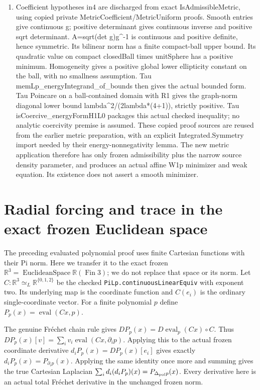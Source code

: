 \documentclass[11pt]{article}
\theoremstyle{definition}
\theoremstyle{remark}
\numberwithin{equation}{section}
\providecommand{\tightlist}{}
\begin{document}
\begin{enumerate}
\def\labelenumi{\arabic{enumi}.}
\setcounter{enumi}{5}
\tightlist
\item
  Coefficient hypotheses in4 are discharged from exact
  IsAdmissibleMetric, using copied private
  MetricCoefficient/MetricUniform proofs. Smooth entries give continuous
  g; positive determinant gives continuous inverse and positive sqrt
  determinant. A=sqrt(det g)g\^{}-1 is continuous and positive definite,
  hence symmetric. Its bilinear norm has a finite compact-ball upper
  bound. Its quadratic value on compact closedBall times unitSphere has
  a positive minimum. Homogeneity gives a positive global lower
  ellipticity constant on the ball, with no smallness assumption. Tau
  memLp\_energyIntegrand\_of\_bounds then gives the actual bounded form.
  Tau Poincare on a ball-contained domain with R1 gives the graph-norm
  diagonal lower bound lambda\^{}2/(2lambda*(4+1)), strictly positive.
  Tau isCoercive\_energyFormH1L0 packages this actual checked
  inequality; no analytic coercivity premise is assumed. These copied
  proof sources are reused from the earlier metric preparation, with an
  explicit Integrated.Symmetry import needed by their
  energy-nonnegativity lemma. The new metric application therefore has
  only frozen admissibility plus the narrow source density parameter,
  and produces an actual affine W1p minimizer and weak equation. Its
  existence does not assert a smooth minimizer.
\end{enumerate}

\clearpage
\section{Radial forcing and trace in the exact frozen Euclidean space}
\label{expanded:green-euclidean-realization}
The preceding evaluated polynomial proof uses finite Cartesian functions
with their Pi norm. Here we transfer it to the exact frozen
$\mathbb R^3=\operatorname{EuclideanSpace}\mathbb R(\operatorname{Fin}3)$;
we do not replace that space or its norm. Let
$C:\mathbb R^3\simeq_L\mathbb R^{\{0,1,2\}}$ be the checked
\texttt{PiLp.continuousLinearEquiv} with exponent two. Its underlying
map is the coordinate function and $C(e_i)$ is the ordinary single-coordinate
vector. For a finite polynomial $p$ define
$P_p(x)=\operatorname{eval}(Cx,p)$.

The genuine Fr\'echet chain rule gives
$DP_p(x)=D\operatorname{eval}_p(Cx)\circ C$.
Thus $DP_p(x)[v]=\sum_i v_i\operatorname{eval}(Cx,\partial_i p)$.
Applying this to the actual frozen coordinate derivative
$d_iP_p(x)=DP_p(x)[e_i]$ gives exactly
$d_iP_p(x)=P_{\partial_i p}(x)$. Applying the same identity once more
and summing gives the true Cartesian Laplacian
$\sum_i d_i(d_iP_p)(x)=P_{\Delta_{\rm pol}p}(x)$.
Every derivative here is an actual total Fr\'echet derivative in the
unchanged frozen norm.
\end{document}
